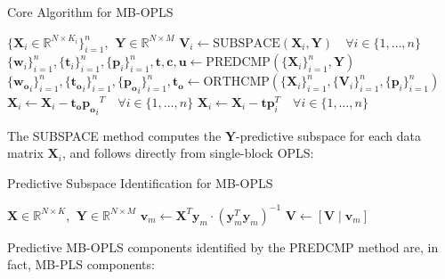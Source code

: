 \begin{algorithm}[H]
\caption{Core Algorithm for MB-OPLS}
\label{algorithm.9.1}
\begin{algorithmic}[1]
\REQUIRE $\{\mathbf{X}_i \in \mathbb{R}^{N \times K_i}\}_{i=1}^n$,%
         $\:\mathbf{Y} \in \mathbb{R}^{N \times M}$
\STATE $\mathbf{V}_i \gets \text{SUBSPACE}(\mathbf{X}_i, \mathbf{Y})
        \quad \forall i \in \{1, \dots, n\}$
\STATE $\{\mathbf{w}_i\}_{i=1}^n,
        \{\mathbf{t}_i\}_{i=1}^n,
        \{\mathbf{p}_i\}_{i=1}^n,
        \mathbf{t}, \mathbf{c}, \mathbf{u} \gets
        \text{PREDCMP}(\{\mathbf{X}_i\}_{i=1}^n, \mathbf{Y})$
\STATE $\{\mathbf{w_o}_i\}_{i=1}^n,
        \{\mathbf{t_o}_i\}_{i=1}^n,
        \{\mathbf{p_o}_i\}_{i=1}^n,
        \mathbf{t_o} \gets
        \text{ORTHCMP}(\{\mathbf{X}_i\}_{i=1}^n,
                       \{\mathbf{V}_i\}_{i=1}^n,
                       \{\mathbf{p}_i\}_{i=1}^n)$
\STATE $\mathbf{X}_i \gets \mathbf{X}_i - \mathbf{t_o} {\mathbf{p_o}_i}^T
        \quad \forall i \in \{1, \dots, n\}$
\STATE $\mathbf{X}_i \gets \mathbf{X}_i - \mathbf{t} \mathbf{p}_i^T
        \quad \forall i \in \{1, \dots, n\}$
\end{algorithmic}
\end{algorithm}

\begin{doublespace}
The SUBSPACE method computes the $\mathbf{Y}$-predictive subspace
for each data matrix $\mathbf{X}_i$, and follows directly from
single-block OPLS:
\end{doublespace}

\begin{algorithm}[H]
\caption{Predictive Subspace Identification for MB-OPLS}
\label{algorithm.9.2}
\begin{algorithmic}[1]
\REQUIRE $\mathbf{X} \in \mathbb{R}^{N \times K}$,%
       $\:\mathbf{Y} \in \mathbb{R}^{N \times M}$
  \STATE $\mathbf{v}_m \gets \mathbf{X}^T \mathbf{y}_m
          \cdot \left( \mathbf{y}_m^T \mathbf{y}_m \right)^{-1}$
  \STATE $\mathbf{V} \gets [\mathbf{V} \mid \mathbf{v}_m]$
\ENDFOR
\end{algorithmic}
\end{algorithm}

\begin{doublespace}
Predictive MB-OPLS components identified by the PREDCMP method are, in fact,
MB-PLS components:
\end{doublespace}

